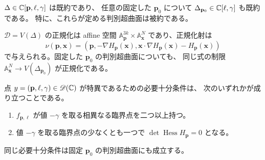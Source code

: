 \begin{theorem}
\label{ldg:thm:normalization}
$\Delta\in\mathbb C[\mathbf p,\ell,\gamma]$ は既約であり、
任意の固定した $\mathbf p_0$ について
$\Delta_{\mathbf p_0}\in\mathbb C[\ell,\gamma]$ も既約である。
特に、これらが定める判別超曲面は被約である。

$\mathscr D=V(\Delta)$ の正規化は affine 空間
$\mathbb A^{3k}_{\mathbf p}\times\mathbb A^N_{\mathbf x}$ であり、正規化射は
\begin{equation}\label{ldg:eq:normalization-map}
 \nu(\mathbf p,\mathbf x)=
 \left(\mathbf p,
       -\nabla H_{\mathbf p}(\mathbf x),
       \mathbf x\cdot\nabla H_{\mathbf p}(\mathbf x)-H_{\mathbf p}(\mathbf x)\right)
\end{equation}
で与えられる。固定した $\mathbf p_0$ の判別超曲面についても、
同じ式の制限 $\mathbb A^N_{\mathbf x}\to V(\Delta_{\mathbf p_0})$ が正規化である。

点 $y=(\mathbf p,\ell,\gamma)\in\mathscr D(\mathbb C)$ が特異であるための必要十分条件は、
次のいずれかが成り立つことである。
\begin{enumerate}
 \item $f_{\mathbf p,\ell}$ が値 $-\gamma$ を取る相異なる臨界点を二つ以上持つ。
 \item 値 $-\gamma$ を取る臨界点の少なくとも一つで
       $\det\operatorname{Hess}H_{\mathbf p}=0$ となる。
\end{enumerate}
同じ必要十分条件は固定 $\mathbf p_0$ の判別超曲面にも成立する。
\end{theorem}

